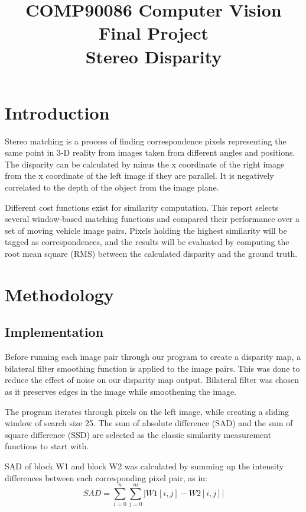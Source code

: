 \documentclass[conference]{IEEEtran}
\begin{document}
\title{COMP90086 Computer Vision Final Project\\
Stereo Disparity
}
\author{
\and
{}
}
\maketitle

\thispagestyle{plain}
\pagestyle{plain}

\section{Introduction}
Stereo matching is a process of finding correspondence pixels representing the same point in 3-D reality from images taken from different angles and positions. The disparity can be calculated by minus the x coordinate of the right image from the x coordinate of the left image if they are parallel. It is negatively correlated to the depth of the object from the image plane.

Different cost functions exist for similarity computation. This report selects several window-based matching functions and compared their performance over a set of moving vehicle image pairs. Pixels holding the highest similarity will be tagged as correspondences, and the results will be evaluated by computing the root mean square (RMS) between the calculated disparity and the ground truth.
\section{Methodology}
\subsection{Implementation}
Before running each image pair through our program to create a disparity map, a bilateral filter smoothing function is applied to the image pairs. This was done to reduce the effect of noise on our disparity map output. Bilateral filter was chosen as it preserves edges in the image while smoothening the image.

The program iterates through pixels on the left image, while creating a sliding window of search size 25. The sum of absolute difference (SAD) and the sum of square difference (SSD) are selected as the classic similarity measurement functions to start with.

SAD of block W1 and block W2 was calculated by summing up the intensity differences between each corresponding pixel pair, as in:
\begin{equation*}
    SAD=\sum^{n}_{i=0}\sum^{m}_{j=0}|W1[i,j]-W2[i,j]|
\end{equation*}
\end{document}
